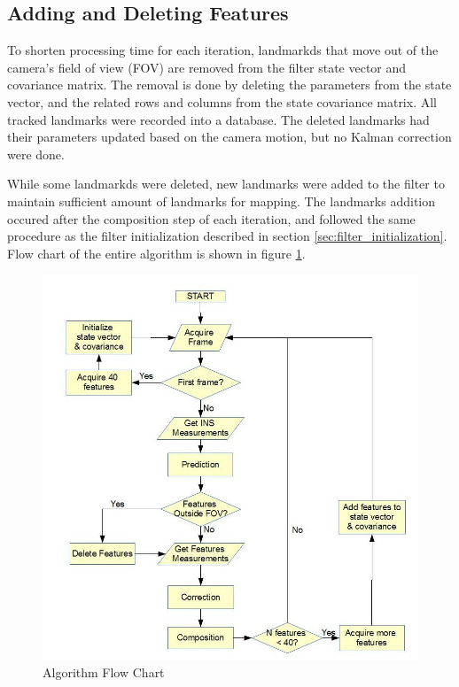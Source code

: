 \subsection{Adding and Deleting Features}
To shorten processing time for each iteration, landmarkds that move
out of the camera's field of view (FOV) are removed from the filter
state vector and covariance matrix. The removal is done by deleting
the parameters from the state vector, and the related rows and columns
from the state covariance matrix. All tracked landmarks were recorded
into a database. The deleted landmarks had their parameters updated
based on the camera motion, but no Kalman correction were done.

While some landmarkds were deleted, new landmarks were added to the
filter to maintain sufficient amount of landmarks for mapping. The
landmarks addition occured after the composition step of each
iteration, and followed the same procedure as the filter
initialization described in section \ref{sec:filter_initialization}.
Flow chart of the entire algorithm is shown in figure
\ref{fig:flowchart}.

\begin{figure}[h]
\centering
\includegraphics[width=12cm, keepaspectratio=true]{./Figures/flow_chart.jpg}
\caption{Algorithm Flow Chart}
\label{fig:flowchart}
\end{figure}



